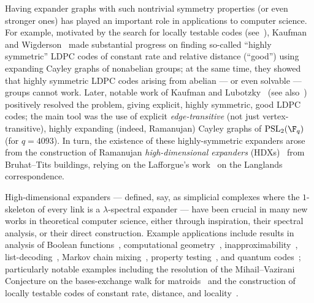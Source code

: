 \documentclass[11pt]{article}
\newcommand{\PSL}{{\mathrm{PSL}}}
\begin{document}
Having expander graphs with such nontrivial symmetry properties (or even stronger ones) has played an important role in applications to computer science.
For example, motivated by the search for locally testable codes (see~\cite{KS08}), Kaufman and Wigderson~\cite{KW16} made substantial progress on finding so-called ``highly symmetric'' LDPC codes of constant rate and relative distance (``good'') using expanding Cayley graphs of nonabelian groups; at the same time, they showed that highly symmetric LDPC codes arising from abelian --- or even solvable --- groups cannot work.
Later, notable work of Kaufman and Lubotzky~\cite{KL12} (see also~\cite{Bec16}) positively resolved the problem, giving explicit, highly symmetric, good LDPC codes; the main tool was the use of explicit \emph{edge-transitive} (not just vertex-transitive), highly expanding (indeed, Ramanujan) Cayley graphs of $\PSL_2(\F_q)$ (for $q = 4093$).
In turn, the existence of these highly-symmetric expanders arose from the construction of Ramanujan \emph{high-dimensional expanders} (HDXs)~\cite{Bal00,CSZ03,Li04,LSV05,LSV05b,Sar04} from Bruhat--Tits buildings, relying on the Lafforgue's work~\cite{Laf02} on the Langlands correspondence.

High-dimensional expanders --- defined, say, as simplicial complexes where the $1$-skeleton of every link is a $\lambda$-spectral expander --- have been crucial in many new works in theoretical computer science, either through inspiration, their spectral analysis, or their direct construction. 
Example applications include results in analysis of Boolean functions~\cite{DDFH18}, computational geometry~\cite{FGLNP12}, inapproximability~\cite{AJT20,DFHT21}, list-decoding~\cite{AJQST20,DHKNT21}, Markov chain mixing~\cite{AL20}, property testing~\cite{DK17,DD19,KM20,KO20}, and quantum codes~\cite{EKZ20,KT21}; particularly notable examples including the resolution of the Mihail--Vazirani Conjecture on the bases-exchange walk for matroids~\cite{ALOV19} and the construction of locally testable codes of constant rate, distance, and locality~\cite{DELLM21,PK21}.

\end{document}
